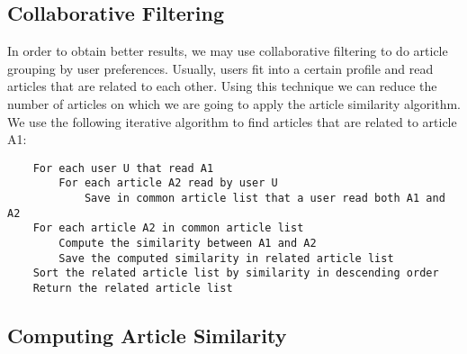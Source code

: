 \subsection{Collaborative Filtering}
\label{sec:collaborative-filtering}
In order to obtain better results, we may use collaborative filtering to do article grouping by user preferences. Usually, users fit into a certain profile and read articles that are related to each other. Using this technique we can reduce the number of articles on which we are going to apply the article similarity algorithm. We use the following iterative algorithm\cite{item-to-item-recomm} to find articles that are related to article A1:
\lstset{language=make,caption=Item to item collaborative filtering,label=lst:app-make}
\begin{lstlisting}
	For each user U that read A1
		For each article A2 read by user U
			Save in common article list that a user read both A1 and A2
	For each article A2 in common article list
		Compute the similarity between A1 and A2
		Save the computed similarity in related article list
	Sort the related article list by similarity in descending order
	Return the related article list
\end{lstlisting}

\subsection{Computing Article Similarity}
\label{sec:computing-article-similarity}

